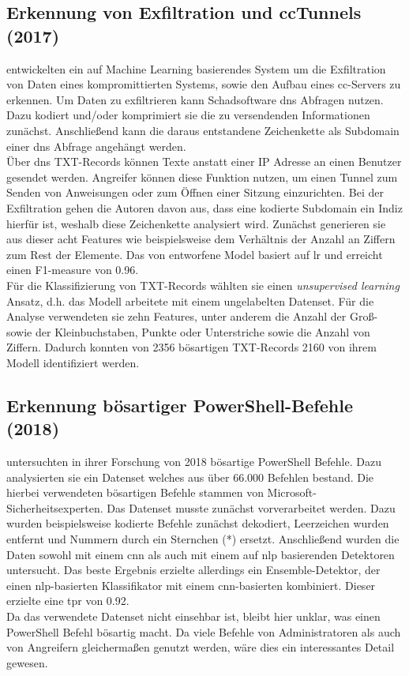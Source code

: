 \documentclass[
    12pt, %
    DIV10,
    ngerman, %
    a4paper, %
    oneside, %
    titlepage, %
    parskip=half, %
    headings=normal, %
    listof=totoc, %
    bibliography=totoc, %
    index=totoc, %
    captions=tableheading, %
    final %
]{scrreprt}
\begin{document}
\subsection{Erkennung von Exfiltration und \acs{cc}Tunnels (2017)}
\textcite{Das2018} entwickelten ein auf Machine Learning basierendes System um die Exfiltration von Daten eines kompromittierten Systems, sowie den Aufbau eines \ac{cc}-Servers zu erkennen. Um Daten zu exfiltrieren kann Schadsoftware \ac{dns} Abfragen nutzen. Dazu kodiert und/oder komprimiert sie die zu versendenden Informationen zunächst. Anschließend kann die daraus entstandene Zeichenkette als Subdomain einer \ac{dns} Abfrage angehängt werden.\\
Über \ac{dns} TXT-Records können Texte anstatt einer IP Adresse an einen Benutzer gesendet werden. Angreifer können diese Funktion nutzen, um einen Tunnel zum Senden von Anweisungen oder zum Öffnen einer Sitzung einzurichten.
Bei der Exfiltration gehen die Autoren davon aus, dass eine kodierte Subdomain ein Indiz hierfür ist, weshalb diese Zeichenkette analysiert wird. Zunächst generieren sie aus dieser acht Features wie beispielsweise dem Verhältnis der Anzahl an Ziffern zum Rest der Elemente. Das von \textcite{Das2018} entworfene Model basiert auf \acl{lr} und erreicht einen F1-measure von 0.96.\\
Für die Klassifizierung von TXT-Records wählten sie einen \emph{unsupervised learning} Ansatz, d.h. das Modell arbeitete mit einem ungelabelten Datenset. Für die Analyse verwendeten sie zehn Features, unter anderem die Anzahl der Groß- sowie der Kleinbuchstaben, Punkte oder Unterstriche sowie die Anzahl von Ziffern. Dadurch konnten von 2356 bösartigen TXT-Records 2160 von ihrem Modell identifiziert werden.
%
\subsection{Erkennung bösartiger PowerShell-Befehle (2018)}
\textcite{Hendler2018} untersuchten in ihrer Forschung von 2018 bösartige PowerShell Befehle. Dazu analysierten sie ein Datenset welches aus über 66.000 Befehlen bestand. Die hierbei verwendeten bösartigen Befehle stammen von Microsoft-Sicherheitsexperten.  Das Datenset musste zunächst vorverarbeitet werden. Dazu wurden beispielsweise kodierte Befehle zunächst dekodiert, Leerzeichen wurden entfernt und Nummern durch ein Sternchen (*) ersetzt. Anschließend wurden die Daten sowohl mit einem \ac{cnn} als auch mit einem auf \ac{nlp} basierenden Detektoren untersucht. Das beste Ergebnis erzielte allerdings ein Ensemble-Detektor, der einen \ac{nlp}-basierten Klassifikator mit einem \ac{cnn}-basierten kombiniert. Dieser erzielte eine \ac{tpr} von 0.92.\\
Da das verwendete Datenset nicht einsehbar ist, bleibt hier unklar, was einen PowerShell Befehl bösartig macht. Da viele Befehle von Administratoren als auch von Angreifern gleichermaßen genutzt werden, wäre dies ein interessantes Detail gewesen.
%
\end{document}
